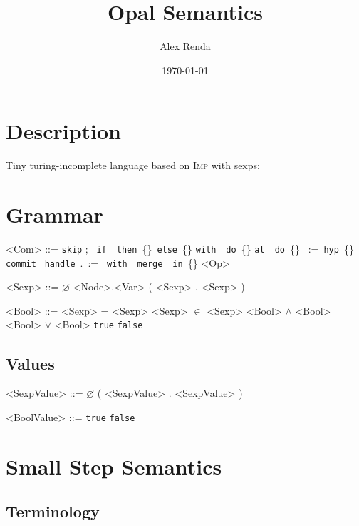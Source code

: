 \documentclass{article}
\title{Opal Semantics}
\author{Alex Renda}
\date{\today}
\newcommand{\skipcom}{\texttt{skip}}
\newcommand{\seqcom}[2]{#1;\ #2}
\newcommand{\ifcom}[3]{\texttt{if}\ #1\ \texttt{then}\ \{#2\}\ \texttt{else}\ \{#3\}}
\newcommand{\withcom}[2]{\texttt{with}\ #1\ \texttt{do}\ \{#2\}}
\newcommand{\atcom}[2]{\texttt{at}\ #1\ \texttt{do}\ \{#2\}}
\newcommand{\hypcom}[2]{#1\ :=\ \texttt{hyp}\ \{#2\}}
\newcommand{\commitcom}[1]{\texttt{commit}\ #1}
\newcommand{\handlecom}[6]{\texttt{handle}\ #1.#2\ := \textit{#3}\ \texttt{with}\ #4\ \texttt{merge}\ #5\ \texttt{in}\ \{#6\}} %
\newcommand{\true}{\texttt{true}}
\newcommand{\false}{\texttt{false}}
\newcommand{\imp}{\textsc{Imp}\xspace}
\begin{document}
\maketitle

\section{Description}

Tiny turing-incomplete language based on \imp with sexps:

\section{Grammar}

\begin{grammar}
<Com> ::= \skipcom
\alt \seqcom{}{}
\alt \ifcom{}{\synt{Com}}{}
\alt \withcom{}{}
\alt \atcom{}{}
\alt \hypcom{}{}
\alt \commitcom{}
\alt \handlecom{}{}{}{}{\synt{Sexp}}{\synt{Com}}
\alt <Op>

<Sexp> ::= $\varnothing$
\alt <Node>.<Var>
\alt ( <Sexp> . <Sexp> )

<Bool> ::= <Sexp> = <Sexp>
\alt <Sexp> $\in$ <Sexp>
\alt <Bool> $\land$ <Bool>
\alt <Bool> $\lor$ <Bool>
\alt \true
\alt \false

\end{grammar}

\subsection{Values}

\begin{grammar}
<SexpValue> ::= $\varnothing$
\alt ( <SexpValue> . <SexpValue> )

<BoolValue> ::= \true
\alt \false
\end{grammar}

\section{Small Step Semantics}
\subsection{Terminology}
\end{document}

